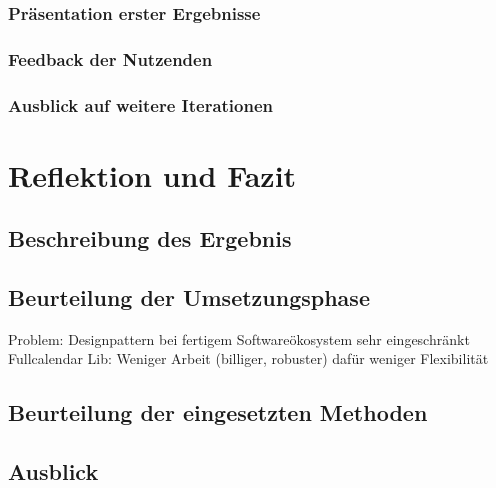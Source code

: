 \documentclass[12pt]{article}
\begin{document}
\subsubsection{Präsentation erster Ergebnisse}
\subsubsection{Feedback der Nutzenden}
\subsubsection{Ausblick auf weitere Iterationen}

\section{Reflektion und Fazit}
\subsection{Beschreibung des Ergebnis}
\subsection{Beurteilung der Umsetzungsphase}
Problem: Designpattern bei fertigem Softwareökosystem sehr eingeschränkt
Fullcalendar Lib: Weniger Arbeit (billiger, robuster) dafür weniger
Flexibilität

\subsection{Beurteilung der eingesetzten Methoden}

\subsection{Ausblick}

\newpage



\end{document}
